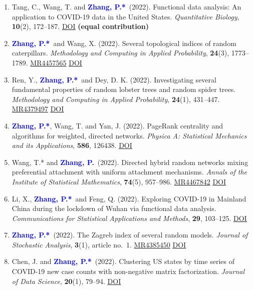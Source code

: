 \documentclass[12pt]{article}
\def \MR #1{\href{http://www.ams.org/mathscinet-getitem?mr=#1}{MR#1}}
\def \DOI #1{\href{http://doi.org/#1}{\underline{DOI}}}
\newcommand{\PZ}{\textcolor{blue}{\textbf{Zhang, P.*}}}
\newcommand{\PZnot}{\textcolor{blue}{\textbf{Zhang, P.}}}
\begin{document}
\begin{enumerate}
		\item {\sc Tang, C., Wang, T.} and \PZ\ (2022). 
		Functional data analysis: An application to COVID-19 data in
		the United States. {\em Quantitative Biology}, {\bf 10}(2), 
		172--187. \DOI{10.15302/J-QB-022-0300}
		{\bf (equal contribution)}
		
		\item \PZ\ and {\sc Wang, X.} (2022). Several 
		topological indices of random caterpillars. 
		{\em Methodology and Computing in Applied Probability}, {\bf 
		24}(3), 1773--1789. \MR{4457565} 
		\DOI{10.1007/s11009-021-09895-1}
		
		\item {\sc Ren, Y.}, \PZ\ and {\sc Dey, D. K.} (2022). 
		Investigating several fundamental properties of random 
		lobster trees and random spider trees. {\em Methodology and 
		Computing in Applied Probability}, {\bf 24}(1), 431--447. 
		\MR{4379497} \DOI{10.1007/s11009-021-09863-9} 
		
		\item \PZ, {\sc Wang, T.} and {\sc Yan, J.} (2022). PageRank 
		centrality and algorithms for weighted, directed networks. 
		{\em Physica A: Statistical Mechanics and its Applications}, 
		{\bf 586}, 126438. \DOI{10.1016/j.physa.2021.126438}
		
		\item {\sc Wang, T.*} and \PZnot\ (2022). Directed 
		hybrid random networks mixing preferential attachment with 
		uniform attachment mechanisms. {\em Annals of the Institute 
		of Statistical Mathematics}, {\bf 74}(5), 957--986. 
		\MR{4467842} \DOI{10.1007/s10463-022-00827-5}
		
		\item {\sc Li, X.}, \PZ\ and {\sc Feng, Q.} (2022). 
		Exploring COVID-19 in Mainland China during the lockdown of 
		Wuhan via functional data analysis. {\em Communications for 
		Statistical Applications and Methods}, {\bf 29}, 103--125. 
		\DOI{10.29220/CSAM.2022.29.1.103}
		
		\item \PZ\ (2022). The Zagreb index of several random 
		models. {\em Journal of Stochastic Analysis}, {\bf 3}(1), 
		article no.\ 1. \MR{4385450} \DOI{10.31390/josa.3.1.01}
		
		\item {\sc Chen, J.} and \PZ\ (2022). Clustering US states by time series of COVID-19 new case counts with non-negative matrix	factorization. {\em Journal of Data Science}, {\bf 20}(1), 79--94.
		\href{https://doi.org/10.6339/22-JDS1036}{\underline{DOI}}
		

\end{enumerate}
\end{document}
